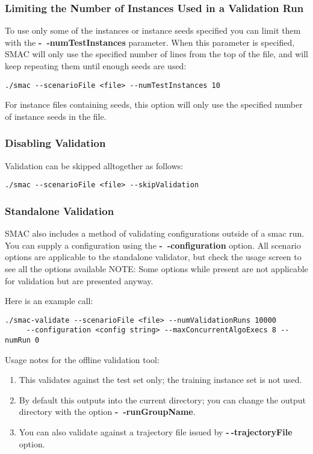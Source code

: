 \subsubsection{Limiting the Number of Instances Used in a Validation Run}

To use only some of the instances or instance seeds specified you can limit them with the \textbf{-~$\!$-numTestInstances} parameter. When this parameter is specified, SMAC will only use the specified number of lines from the top of the file, and will keep repeating them until enough seeds are used: 
\begin{verbatim}
./smac --scenarioFile <file> --numTestInstances 10
\end{verbatim}
For instance files containing seeds, this option will only use the specified number of instance seeds in the file.

\subsubsection{Disabling Validation}
Validation can be skipped alltogether as follows:
\begin{verbatim}
./smac --scenarioFile <file> --skipValidation
\end{verbatim}

\subsubsection{Standalone Validation}
SMAC also includes a method of validating configurations outside of a smac run.
You can supply a configuration using the \textbf{-~$\!$-configuration} option. All scenario options are applicable to the standalone validator, but check the usage screen to see all the options available \textsc{NOTE:} Some options while present are not applicable for validation but are presented anyway.

Here is an example call:
\begin{verbatim}
./smac-validate --scenarioFile <file> --numValidationRuns 10000 
     --configuration <config string> --maxConcurrentAlgoExecs 8 --numRun 0
\end{verbatim}
%
Usage notes for the offline validation tool:
\begin{enumerate}
\item This validates against the test set only; the training instance set is not used.
\item By default this outputs into the current directory; you can change the output directory with the option \textbf{-~$\!$-runGroupName}.
\item You can also validate against a trajectory file issued by \textbf{-$~\!$-trajectoryFile} option. 
\end{enumerate}

